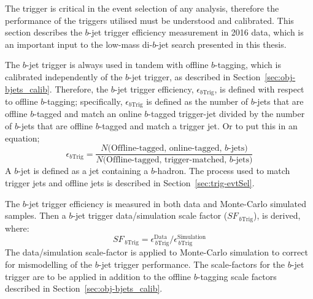 The trigger is critical in the event selection of any analysis,
therefore the performance of the triggers utilised must be understood and calibrated.
This section describes the \mbox{$b$-jet} trigger efficiency measurement in 2016 data,
which is an important input to the low-mass di-$b$-jet search presented in this thesis.


The $b$-jet trigger is always used in tandem with offline $b$-tagging, which is calibrated independently of the $b$-jet trigger, as described in Section~\ref{sec:obj-bjets_calib}.
Therefore, the $b$-jet trigger efficiency, $\epsilon_{b\text{Trig}}$, is defined with respect to offline $b$-tagging;
specifically, $\epsilon_{b\text{Trig}}$ is defined as the number of $b$-jets that are offline $b$-tagged and match an online $b$-tagged trigger-jet
divided by the number of $b$-jets that are offline $b$-tagged and match a trigger jet.
Or to put this in an equation;
\begin{equation}
  \epsilon_{b\text{Trig}} = \frac{N(\text{Offline-tagged, online-tagged, $b$-jets)}}{N(\text{Offline-tagged, trigger-matched, $b$-jets)}}
  \label{eq:trig-eff}
\end{equation}
A $b$-jet is defined as a jet containing a $b$-hadron.
The process used to match trigger jets and offline jets is described in Section~\ref{sec:trig-evtSel}.

The $b$-jet trigger efficiency is measured in both data and Monte-Carlo simulated samples.
Then a $b$-jet trigger data/simulation scale factor ($SF_{\,b\text{Trig}}$), is derived, where:
\begin{equation}
 SF_{\,b\text{Trig}} = \epsilon_{\,b\text{Trig}}^{\text{Data}}/\epsilon_{\,b\text{Trig}}^{\text{Simulation}}
\end{equation}
The data/simulation scale-factor is applied to Monte-Carlo simulation to correct for mismodelling of the $b$-jet trigger performance.
The scale-factors for the $b$-jet trigger are to be applied in addition to the offline $b$-tagging scale factors described in Section~\ref{sec:obj-bjets_calib}.

